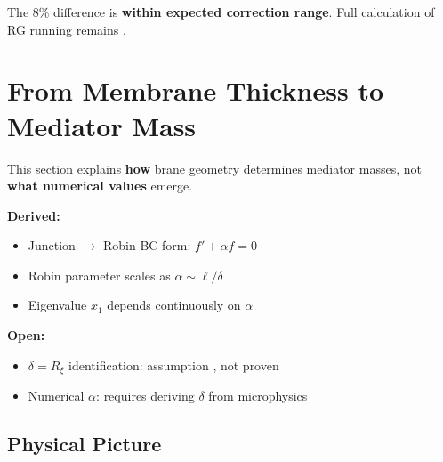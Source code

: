The $8\%$ difference is \textbf{within expected correction range}. Full calculation
of RG running remains \tagOpen{}.

\section{From Membrane Thickness to Mediator Mass}
\label{sec:mediator}

\begin{tcolorbox}[edcGuardrail, title=\textbf{Epistemic Status: Mediator Mechanism}]
This section explains \textbf{how} brane geometry determines mediator masses,
not \textbf{what numerical values} emerge.

\textbf{Derived:}
\begin{itemize}[nosep]
\item Junction $\to$ Robin BC form: $f' + \alpha f = 0$ \tagDc{}
\item Robin parameter scales as $\alpha \sim \ell/\delta$ \tagDc{}
\item Eigenvalue $x_1$ depends continuously on $\alpha$ \tagDc{}
\end{itemize}

\textbf{Open:}
\begin{itemize}[nosep]
\item $\delta = R_\xi$ identification: assumption \tagP{}, not proven
\item Numerical $\alpha$: requires deriving $\delta$ from microphysics
\end{itemize}
\end{tcolorbox}

\subsection{Physical Picture}

